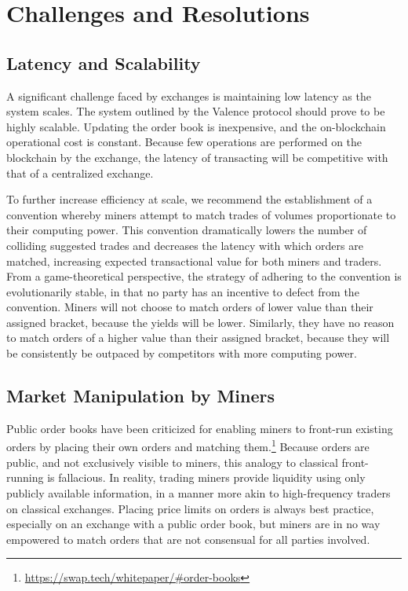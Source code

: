 \documentclass[a4paper]{article}
\begin{document}
\section*{Challenges and Resolutions}
  \subsection*{Latency and Scalability}
  	A significant challenge faced by exchanges is maintaining low latency
    as the system scales.
    The system outlined by the Valence protocol should prove to be
    highly scalable. Updating the order book is inexpensive,
    and the on-blockchain operational cost is constant.
    Because few operations are performed on the blockchain by the exchange,
    the latency of transacting will be competitive with that of a
    centralized exchange.

    To further increase efficiency at scale, we recommend the establishment
    of a convention whereby miners attempt to match trades of volumes
    proportionate to their computing power. This convention dramatically
    lowers the number of colliding suggested trades and decreases the
    latency with which orders are matched, increasing expected transactional
    value for both miners and traders. From a game-theoretical perspective,
    the strategy of adhering to the convention is evolutionarily stable, in
    that no party has an incentive to defect from the convention. Miners
    will not choose to match orders of lower value than their assigned
    bracket, because the yields will be lower. Similarly, they have no
    reason to match orders of a higher value than their assigned bracket,
    because they will be consistently be outpaced by competitors with more
    computing power.
  \subsection*{Market Manipulation by Miners}
  	Public order books have been criticized for enabling miners to front-run
    existing orders by placing their own orders and matching
    them.\footnote[6]{\url{https://swap.tech/whitepaper/\#order-books}}
    Because orders are public, and not exclusively visible to miners, this
    analogy to classical front-running is fallacious.
    In reality, trading miners provide liquidity using only publicly
    available information, in a manner more akin to high-frequency
    traders on classical exchanges. Placing price limits on orders is always
    best practice, especially on an exchange with a public order book, but
    miners are in no way empowered to match orders that are not consensual
    for all parties involved.
\end{document}

